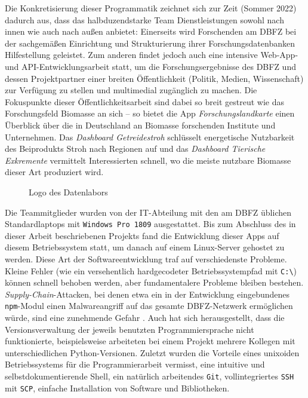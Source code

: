 Die Konkretisierung dieser Programmatik zeichnet sich zur Zeit (Sommer 2022) dadurch aus, dass das halbduzendstarke Team Dienstleistungen sowohl nach innen wie auch nach außen anbietet:
Einerseits wird Forschenden am DBFZ bei der sachgemäßen Einrichtung und Strukturierung ihrer Forschungsdatenbanken Hilfestellung geleistet.
Zum anderen findet jedoch auch eine intensive Web-App- und \acs{API}-Entwicklungsarbeit statt, um die Forschungsergebnisse des DBFZ und dessen Projektpartner einer breiten Öffentlichkeit (Politik, Medien, Wissenschaft) zur Verfügung zu stellen und multimedial zugänglich zu machen.
Die Fokuspunkte dieser Öffentlichkeitsarbeit sind dabei so breit gestreut wie das Forschungsfeld Biomasse an sich -- so bietet die App \textit{Forschungslandkarte} \cite{dbfzforschungsland} einen Überblick über die in Deutschland an Biomasse forschenden Institute und Unternehmen.
Das \textit{Dashboard Getreidestroh} \cite{dbfzgetreidestoh} schlüsselt energetische Nutzbarkeit des Beiprodukts Stroh nach Regionen auf und das \textit{Dashboard Tierische Exkremente} \cite{dbfzexkremente} vermittelt Interessierten schnell, wo die meiste nutzbare Biomasse dieser Art produziert wird.

\begin{wrapfigure}{}{.45\textwidth}
\centering
\def\svgwidth{175pt}
\vspace{-5pt}
\caption{Logo des Datenlabors}
\end{wrapfigure}
Die Teammitglieder wurden von der IT-Abteilung mit den am DBFZ üblichen Standardlaptops mit \texttt{Windows Pro 1809} ausgestattet.
Bis zum Abschluss des in dieser Arbeit beschriebenen Projekts fand die Entwicklung dieser Apps auf diesem Betriebssystem statt, um danach auf einem Linux-Server gehostet zu werden. Diese Art der Softwareentwicklung traf auf verschiedenste Probleme.
Kleine Fehler (wie ein versehentlich hardgecodeter Betriebssystempfad mit \texttt{C:\textbackslash}) können schnell behoben werden, aber fundamentalere Probleme bleiben bestehen.
\textit{Supply-Chain}-Attacken, bei denen etwa ein in der Entwicklung eingebundenes \texttt{\acs{npm}}-Modul einen Malwareangriff auf das gesamte DBFZ-Netzwerk ermöglichen würde, sind eine zunehmende Gefahr \cite{Volkert2022Sep}.
Auch hat sich herausgestellt, dass die Versionsverwaltung der jeweils benutzten Programmiersprache nicht funktionierte, beispielsweise arbeiteten bei einem Projekt mehrere Kollegen mit unterschiedlichen Python-Versionen.
Zuletzt wurden die Vorteile eines unixoiden Betriebssystems für die Programmierarbeit vermisst, eine intuitive und selbstdokumentierende Shell, ein natürlich arbeitendes \texttt{Git}, vollintegriertes \texttt{\acs{SSH}} mit \texttt{\acs{SCP}}, einfache Installation von Software und Bibliotheken.

